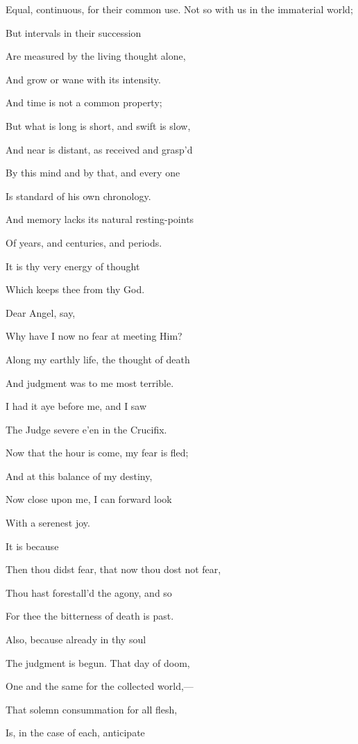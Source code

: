 Equal, continuous, for their common use. Not so with us in the immaterial world;

But intervals in their succession

Are measured by the living thought alone,

And grow or wane with its intensity.

And time is not a common property;

But what is long is short, and swift is slow,

And near is distant, as received and grasp'd

By this mind and by that, and every one

Is standard of his own chronology.

And memory lacks its natural resting-points

Of years, and centuries, and periods.

It is thy very energy of thought

Which keeps thee from thy God.


Dear Angel, say,

Why have I now no fear at meeting Him?

Along my earthly life, the thought of death

And judgment was to me most terrible.

I had it aye before me, and I saw

The Judge severe e'en in the Crucifix.

Now that the hour is come, my fear is fled;

And at this balance of my destiny,

Now close upon me, I can forward look

With a serenest joy.


It is because

Then thou didst fear, that now thou dost not fear,

Thou hast forestall'd the agony, and so

For thee the bitterness of death is past.

Also, because already in thy soul

The judgment is begun. That day of doom,

One and the same for the collected world,—

That solemn consummation for all flesh,

Is, in the case of each, anticipate

